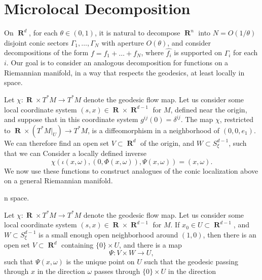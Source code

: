 \documentclass{article}
\DeclareMathOperator{\RR}{\mathbf{R}}
\theoremstyle{plain}
\theoremstyle{remark}
\theoremstyle{definition}
\begin{document}
\section{Microlocal Decomposition}

On $\RR^d$, for each $\theta \in (0,1)$, it is natural to decompose $\RR^n$ into $N = O(1/\theta)$ disjoint conic sectors $\Gamma_1,\dots,\Gamma_N$ with aperture $O(\theta)$, and consider decompositions of the form $f = f_1 + \dots + f_N$, where $\widehat{f_i}$ is supported on $\Gamma_i$ for each $i$. Our goal is to consider an analogous decomposition for functions on a Riemannian manifold, in a way that respects the geodesics, at least locally in space.

Let $\chi: \RR \times T^*M \to T^*M$ denote the geodesic flow map. Let us consider some local coordinate system $(s,x) \in \RR \times \RR^{d-1}$ for $M$, defined near the origin, and suppose that in this coordinate system $g^{ij}(0) = \delta^{ij}$. The map $\chi$, restricted to $\RR \times (T^* M|_U) \to T^* M$, is a diffeomorphism in a neighborhood of $(0,0,e_1)$. We can therefore find an open set $V \subset \RR^d$ of the origin, and $W \subset S^{d-1}_\xi$, such that we can Consider a locally defined inverse
%
\[ \chi( \iota(x,\omega), (0,\Phi(x,\omega)), \Psi(x,\omega) ) = (x,\omega). \]
%
We now use these functions to construct analogues of the conic localization above on a general Riemannian manifold.

n space.

Let $\chi: \RR \times T^*M \to T^*M$ denote the geodesic flow map. Let us consider some local coordinate system $(s,x) \in \RR \times \RR^{d-1}$ for $M$. If $x_0 \in U \subset \RR^{d-1}$, and $W \subset S^{d-1}_\xi$ is a small enough open neighborhood around $(1,0)$, then there is an open set $V \subset \RR^d$ containing $\{ 0 \} \times U$, and there is a map
%
\[ \Psi: V \times W \to U, \]
%
such that $\Psi(x,\omega)$ is the unique point on $U$ such that the geodesic passing through $x$ in the direction $\omega$ passes through $\{ 0 \} \times U$ in the direction 
\end{document}
